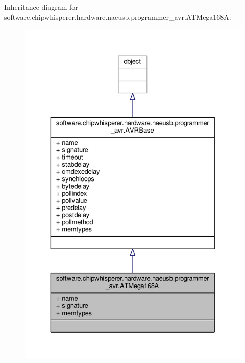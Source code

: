 Inheritance diagram for software.\+chipwhisperer.\+hardware.\+naeusb.\+programmer\+\_\+avr.\+A\+T\+Mega168\+A\+:\nopagebreak
\begin{figure}[H]
\begin{center}
\leavevmode
\includegraphics[width=329pt]{dc/dbe/classsoftware_1_1chipwhisperer_1_1hardware_1_1naeusb_1_1programmer__avr_1_1ATMega168A__inherit__graph}
\end{center}
\end{figure}


